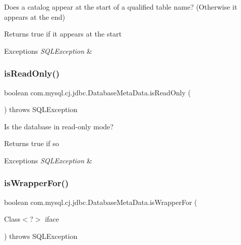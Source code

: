 Does a catalog appear at the start of a qualified table name? (Otherwise it appears at the end)

\begin{DoxyReturn}{Returns}
true if it appears at the start 
\end{DoxyReturn}

\begin{DoxyExceptions}{Exceptions}
{\em S\+Q\+L\+Exception} & \\
\hline
\end{DoxyExceptions}
\mbox{\label{classcom_1_1mysql_1_1cj_1_1jdbc_1_1_database_meta_data_ae2267f22cc38e6bce65f493e566760d1}} 
\subsubsection{\texorpdfstring{is\+Read\+Only()}{isReadOnly()}}
{\footnotesize\ttfamily boolean com.\+mysql.\+cj.\+jdbc.\+Database\+Meta\+Data.\+is\+Read\+Only (\begin{DoxyParamCaption}{ }\end{DoxyParamCaption}) throws S\+Q\+L\+Exception}

Is the database in read-\/only mode?

\begin{DoxyReturn}{Returns}
true if so 
\end{DoxyReturn}

\begin{DoxyExceptions}{Exceptions}
{\em S\+Q\+L\+Exception} & \\
\hline
\end{DoxyExceptions}
\mbox{\label{classcom_1_1mysql_1_1cj_1_1jdbc_1_1_database_meta_data_a8e0ea42ccbf774371b197a8bd88b42d3}} 
\subsubsection{\texorpdfstring{is\+Wrapper\+For()}{isWrapperFor()}}
{\footnotesize\ttfamily boolean com.\+mysql.\+cj.\+jdbc.\+Database\+Meta\+Data.\+is\+Wrapper\+For (\begin{DoxyParamCaption}\item[{Class$<$?$>$}]{iface }\end{DoxyParamCaption}) throws S\+Q\+L\+Exception}

